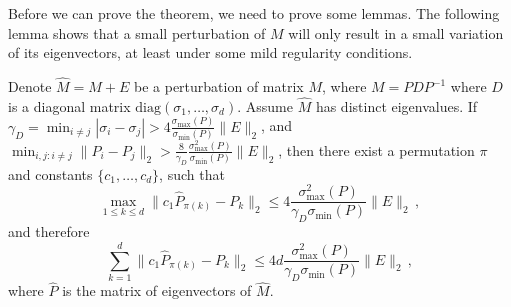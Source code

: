 Before we can prove the theorem, we need to prove some lemmas.
The following lemma shows that a small perturbation of $M$ will only result in a small variation of its eigenvectors, at least under some mild regularity conditions.
\begin{lemma}
\label{lem:eigenvectorvariation}
Denote $\hat{M} = M+E$ be a perturbation of matrix $M$, where $M = PDP^{-1}$ where $D$ is a diagonal matrix $\text{diag}(\sigma_1,\ldots, \sigma_d)$.
Assume $\hat{M}$ has distinct eigenvalues. 
If $\gamma_D  = \min_{i\neq j} |\sigma_i - \sigma_j|> 4 \frac{\sigma_{\max}(P)}{\sigma_{\min}(P)}\|E\|_2$, and $\min_{i,j:i\neq j} \|P_i - P_j\|_2 > \frac{8}{\gamma_D}\frac{\sigma_{\max}^2(P)}{\sigma_{\min}(P) } \|E\|_2$, then there exist a permutation $\pi$ and constants $\{c_1,\ldots,c_d\}$, such that 
\[
\max_{1\le k\le d} \| c_1\hat{P}_{\pi(k)} - P_k\|_2 \le 4  \frac{\sigma_{\max}^2(P)}{\gamma_D \sigma_{\min} (P)} \|E\|_2\,,
\]
and therefore
\[
\sum_{k=1}^{d}\| c_1\hat{P}_{\pi(k)} - P_k\|_2 \le 4d  \frac{\sigma_{\max}^2(P)}{\gamma_D \sigma_{\min}(P)} \|E\|_2\,,
\]
where $\hat{P}$ is the matrix of eigenvectors of $\hat{M}$. 
\end{lemma}
